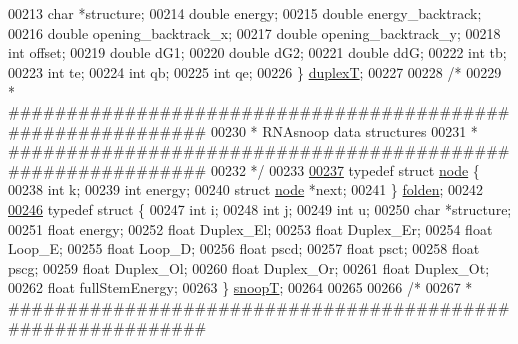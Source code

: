\begin{DoxyCode}
00213   \textcolor{keywordtype}{char}    *structure;
00214   \textcolor{keywordtype}{double}  energy;
00215   \textcolor{keywordtype}{double}  energy\_backtrack;
00216   \textcolor{keywordtype}{double}  opening\_backtrack\_x;
00217   \textcolor{keywordtype}{double}  opening\_backtrack\_y;
00218   \textcolor{keywordtype}{int}     offset;
00219   \textcolor{keywordtype}{double}  dG1;
00220   \textcolor{keywordtype}{double}  dG2;
00221   \textcolor{keywordtype}{double}  ddG;
00222   \textcolor{keywordtype}{int}     tb;
00223   \textcolor{keywordtype}{int}     te;
00224   \textcolor{keywordtype}{int}     qb;
00225   \textcolor{keywordtype}{int}     qe;
00226 \} \hyperlink{group__data__structures_structduplexT}{duplexT};
00227 
00228 \textcolor{comment}{/*}
00229 \textcolor{comment}{ * ############################################################}
00230 \textcolor{comment}{ * RNAsnoop data structures}
00231 \textcolor{comment}{ * ############################################################}
00232 \textcolor{comment}{ */}
00233 
\hyperlink{group__data__structures}{00237} \textcolor{keyword}{typedef} \textcolor{keyword}{struct }\hyperlink{group__data__structures_structnode}{node} \{
00238   \textcolor{keywordtype}{int}         k;
00239   \textcolor{keywordtype}{int}         energy;
00240   \textcolor{keyword}{struct }\hyperlink{group__data__structures_structnode}{node} *next;
00241 \} \hyperlink{group__data__structures_gaaf402058651c8218fa72788d591cda05}{folden};
00242 
\hyperlink{group__data__structures}{00246} \textcolor{keyword}{typedef} \textcolor{keyword}{struct }\{
00247   \textcolor{keywordtype}{int}   i;
00248   \textcolor{keywordtype}{int}   j;
00249   \textcolor{keywordtype}{int}   u;
00250   \textcolor{keywordtype}{char}  *structure;
00251   \textcolor{keywordtype}{float} energy;
00252   \textcolor{keywordtype}{float} Duplex\_El;
00253   \textcolor{keywordtype}{float} Duplex\_Er;
00254   \textcolor{keywordtype}{float} Loop\_E;
00255   \textcolor{keywordtype}{float} Loop\_D;
00256   \textcolor{keywordtype}{float} pscd;
00257   \textcolor{keywordtype}{float} psct;
00258   \textcolor{keywordtype}{float} pscg;
00259   \textcolor{keywordtype}{float} Duplex\_Ol;
00260   \textcolor{keywordtype}{float} Duplex\_Or;
00261   \textcolor{keywordtype}{float} Duplex\_Ot;
00262   \textcolor{keywordtype}{float} fullStemEnergy;
00263 \} \hyperlink{group__data__structures_structsnoopT}{snoopT};
00264 
00265 
00266 \textcolor{comment}{/*}
00267 \textcolor{comment}{ * ############################################################}

\end{DoxyCode}
